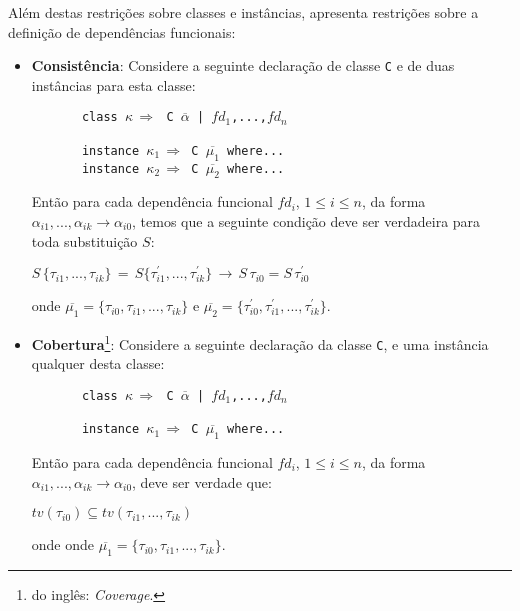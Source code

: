 Al\'em destas restri\c{c}\~oes sobre classes e inst\^ancias, \cite{Jones00} apresenta restri\c{c}\~oes sobre a 
defini\c{c}\~ao de depend\^encias funcionais:
\begin{itemize}
	\item \textbf{Consist\^encia}: Considere a seguinte declara\c{c}\~ao de classe \texttt{C} e de duas inst\^ancias
	      para esta classe:
	      \begin{flushleft}
\verb|       |\texttt{class $\kappa\,\Rightarrow\,$ C $\overline{\alpha}$ | $fd_{1}$,...,$fd_{n}$}\\
\verb| |\\
\verb|       |\texttt{instance $\kappa_{1}\,\Rightarrow$ C $\overline{\mu_{1}}$ where...}\\
\verb|       |\texttt{instance $\kappa_{2}\,\Rightarrow$ C $\overline{\mu_{2}}$ where...}\\
	      \end{flushleft}  
	      Ent\~ao para cada depend\^encia funcional \texttt{$fd_{i}$}, $1\leq i\leq n$, da forma 
	      $\alpha_{i1},...,\alpha_{ik}\rightarrow \alpha_{i0}$, temos que a seguinte condi\c{c}\~ao deve ser verdadeira
	      para toda substitui\c{c}\~ao $S$:
	      \begin{center} 
$S\,\{\tau_{i1},...,\tau_{ik}\}\,=\,S\{\tau^{\prime}_{i1},...,\tau^{\prime}_{ik}\}\,\rightarrow\, 
        S\,\tau_{i0}=S\,\tau^{\prime}_{i0}$ 
	      \end{center}
	      onde $\overline{\mu_{1}}=\{\tau_{i0},\tau_{i1},...,\tau_{ik}\}$ e 
	      $\overline{\mu_{2}}=\{\tau^{\prime}_{i0},\tau^{\prime}_{i1},...,\tau^{\prime}_{ik}\}$.	      
    \item \textbf{Cobertura}\footnote{do ingl\^es: \emph{Coverage}.}: Considere a seguinte declara\c{c}\~ao da 
          classe \texttt{C}, e uma inst\^ancia qualquer desta classe:
	      \begin{flushleft}
\verb|       |\texttt{class $\kappa\,\Rightarrow\,$ C $\overline{\alpha}$ | $fd_{1}$,...,$fd_{n}$}\\
\verb| |\\
\verb|       |\texttt{instance $\kappa_{1}\,\Rightarrow$ C $\overline{\mu_{1}}$ where...}\\
	      \end{flushleft}  
          Ent\~ao para cada depend\^encia funcional \texttt{$fd_{i}$}, $1\leq i\leq n$, da forma 
	      $\alpha_{i1},...,\alpha_{ik}\rightarrow \alpha_{i0}$, deve ser verdade que:
	      \begin{center}
	      	 $tv(\tau_{i0})\subseteq tv(\tau_{i1},...,\tau_{ik})$
	      \end{center}
	      onde onde $\overline{\mu_{1}}=\{\tau_{i0},\tau_{i1},...,\tau_{ik}\}$.
\end{itemize}
